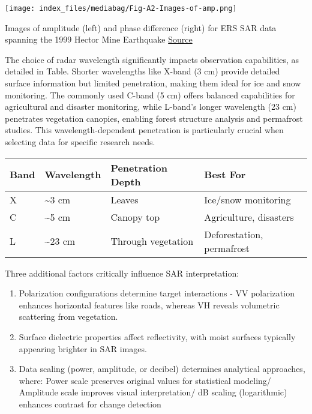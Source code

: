 \documentclass[
  letterpaper,
  DIV=11,
  numbers=noendperiod]{scrreprt}
\providecommand{\tightlist}{%
  \setlength{\itemsep}{0pt}\setlength{\parskip}{0pt}}\usepackage{longtable,booktabs,array}
\begin{document}
\texttt{[image: index\_files/mediabag/Fig-A2-Images-of-amp.png]}

Images of amplitude (left) and phase difference (right) for ERS SAR data
spanning the 1999 Hector Mine Earthquake
\href{https://www.researchgate.net/figure/Fig-A2-Images-of-amplitude-left-and-phase-difference-right-for-ERS-SAR-data_fig8_256830372}{Source}

The choice of radar wavelength significantly impacts observation
capabilities, as detailed in Table. Shorter wavelengths like X-band (3
cm) provide detailed surface information but limited penetration, making
them ideal for ice and snow monitoring. The commonly used C-band (5 cm)
offers balanced capabilities for agricultural and disaster monitoring,
while L-band's longer wavelength (23 cm) penetrates vegetation canopies,
enabling forest structure analysis and permafrost studies. This
wavelength-dependent penetration is particularly crucial when selecting
data for specific research needs.

\begin{longtable}[]{@{}llll@{}}
\toprule\noalign{}
Band & Wavelength & Penetration Depth & Best For \\
\midrule\noalign{}
\endhead
\bottomrule\noalign{}
\endlastfoot
X & \textasciitilde3 cm & Leaves & Ice/snow monitoring \\
C & \textasciitilde5 cm & Canopy top & Agriculture, disasters \\
L & \textasciitilde23 cm & Through vegetation & Deforestation,
permafrost \\
\end{longtable}

Three additional factors critically influence SAR interpretation:

\begin{enumerate}
\def\labelenumi{\arabic{enumi}.}
\tightlist
\item
  Polarization configurations determine target interactions - VV
  polarization enhances horizontal features like roads, whereas VH
  reveals volumetric scattering from vegetation.
\item
  Surface dielectric properties affect reflectivity, with moist surfaces
  typically appearing brighter in SAR images.
\item
  Data scaling (power, amplitude, or decibel) determines analytical
  approaches, where: Power scale preserves original values for
  statistical modeling/ Amplitude scale improves visual interpretation/
  dB scaling (logarithmic) enhances contrast for change detection
\end{enumerate}
\end{document}
